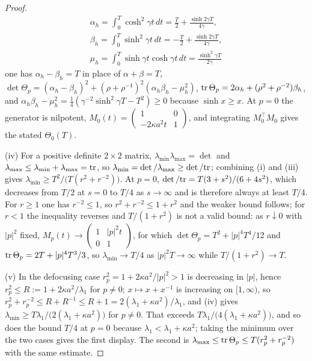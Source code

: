 \begin{proof}
\[
\begin{gathered}
\alpha_h=\int_0^T\cosh^2\gamma t\,dt=\frac T2+\frac{\sinh2\gamma T}{4\gamma},\\
\beta_h=\int_0^T\sinh^2\gamma t\,dt=-\frac T2+\frac{\sinh2\gamma T}{4\gamma},\\
\mu_h=\int_0^T\sinh\gamma t\cosh\gamma t\,dt=\frac{\sinh^2\gamma T}{2\gamma}
\end{gathered}
\]
one has $\alpha_h-\beta_h=T$ in place of $\alpha+\beta=T$, $\det\Theta_p=(\alpha_h-\beta_h)^2+(\rho+\rho^{-1})^2(\alpha_h\beta_h-\mu_h^2)$, $\mathrm{tr}\,\Theta_p=2\alpha_h+(\rho^2+\rho^{-2})\beta_h$, and $\alpha_h\beta_h-\mu_h^2=\frac14(\gamma^{-2}\sinh^2\gamma T-T^2)\ge0$ because $\sinh x\ge x$. At $p=0$ the generator is nilpotent, $M_0(t)=\left(\begin{smallmatrix}1&0\\-2\kappa a^2t&1\end{smallmatrix}\right)$, and integrating $M_0^\top M_0$ gives the stated $\Theta_0(T)$.

(iv) For a positive definite $2\times2$ matrix, $\lambda_{\min}\lambda_{\max}=\det$ and $\lambda_{\max}\le\lambda_{\min}+\lambda_{\max}=\mathrm{tr}$, so $\lambda_{\min}=\det/\lambda_{\max}\ge\det/\mathrm{tr}$; combining (i) and (iii) gives $\lambda_{\min}\ge T^2/\big(T(r^2+r^{-2})\big)$. At $p=0$, $\det/\mathrm{tr}=T(3+s^2)/(6+4s^2)$, which decreases from $T/2$ at $s=0$ to $T/4$ as $s\to\infty$ and is therefore always at least $T/4$. For $r\ge1$ one has $r^{-2}\le1$, so $r^2+r^{-2}\le1+r^2$ and the weaker bound follows; for $r<1$ the inequality reverses and $T/(1+r^2)$ is not a valid bound: as $r\downarrow0$ with $|p|^2$ fixed, $M_p(t)\to\left(\begin{smallmatrix}1&|p|^2t\\0&1\end{smallmatrix}\right)$, for which $\det\Theta_p=T^2+|p|^4T^4/12$ and $\mathrm{tr}\,\Theta_p=2T+|p|^4T^3/3$, so $\lambda_{\min}\to T/4$ as $|p|^2T\to\infty$ while $T/(1+r^2)\to T$.

(v) In the defocusing case $r_p^2=1+2\kappa a^2/|p|^2>1$ is decreasing in $|p|$, hence $r_p^2\le R:=1+2\kappa a^2/\lambda_1$ for $p\ne0$; $x\mapsto x+x^{-1}$ is increasing on $[1,\infty)$, so $r_p^2+r_p^{-2}\le R+R^{-1}\le R+1=2(\lambda_1+\kappa a^2)/\lambda_1$, and (iv) gives $\lambda_{\min}\ge T\lambda_1/\big(2(\lambda_1+\kappa a^2)\big)$ for $p\ne0$. That exceeds $T\lambda_1/\big(4(\lambda_1+\kappa a^2)\big)$, and so does the bound $T/4$ at $p=0$ because $\lambda_1<\lambda_1+\kappa a^2$; taking the minimum over the two cases gives the first display. The second is $\lambda_{\max}\le\mathrm{tr}\,\Theta_p\le T(r_p^2+r_p^{-2})$ with the same estimate.


\end{proof}
